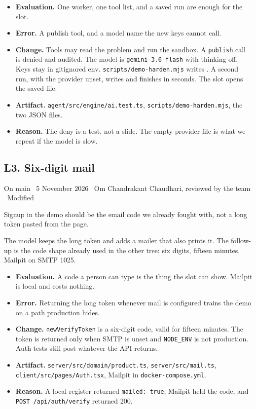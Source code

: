 \documentclass[11pt,a4paper]{article}
\newcommand{\meta}[1]{{\small #1}\par}
\newcommand{\step}[1]{\par\vspace{0.15em}{\bfseries #1}\par\vspace{-0.15em}}
\begin{document}
\step{3. Decision}
\begin{itemize}
\item \textbf{Evaluation.} One worker, one tool list, and a saved run are enough for the slot.
\item \textbf{Error.} A publish tool, and a model name the new keys cannot call.
\item \textbf{Change.} Tools may read the problem and run the sandbox. A \texttt{publish} call is denied and audited. The model is \texttt{gemini-3.6-flash} with thinking off. Keys stay in gitignored env. \texttt{scripts/demo-harden.mjs} writes . A second run, with the provider unset, writes  and finishes in seconds. The slot opens the saved file.
\item \textbf{Artifact.} \texttt{agent/src/engine/ai.test.ts}, \texttt{scripts/demo-harden.mjs}, the two JSON files.
\item \textbf{Reason.} The deny is a test, not a slide. The empty-provider file is what we repeat if the model is slow.
\end{itemize}

\subsection{L3. Six-digit mail}
\meta{On main \textperiodcentered\ 5 November 2026 \textperiodcentered\ Om Chandrakant Chaudhari, reviewed by the team \textperiodcentered\ Modified}

\step{1. Prompt}
Signup in the demo should be the email code we already fought with, not a long token pasted from the page.

\step{2. Reply (summarised)}
The model keeps the long token and adds a mailer that also prints it. The follow-up is the code shape already used in the other tree: six digits, fifteen minutes, Mailpit on SMTP 1025.

\step{3. Decision}
\begin{itemize}
\item \textbf{Evaluation.} A code a person can type is the thing the slot can show. Mailpit is local and costs nothing.
\item \textbf{Error.} Returning the long token whenever mail is configured trains the demo on a path production hides.
\item \textbf{Change.} \texttt{newVerifyToken} is a six-digit code, valid for fifteen minutes. The token is returned only when SMTP is unset and \texttt{NODE\_ENV} is not production. Auth tests still post whatever the API returns.
\item \textbf{Artifact.} \texttt{server/src/domain/product.ts}, \texttt{server/src/mail.ts}, \texttt{client/src/pages/Auth.tsx}, Mailpit in \texttt{docker-compose.yml}.
\item \textbf{Reason.} A local register returned \texttt{mailed: true}, Mailpit held the code, and \texttt{POST /api/auth/verify} returned 200.
\end{itemize}
\end{document}
